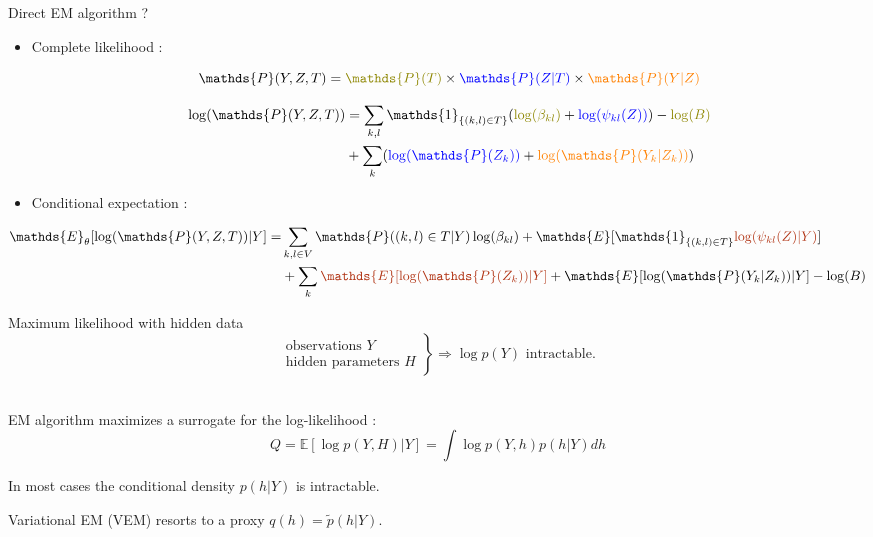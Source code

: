 \documentclass[11pt]{beamer}
\newcommand{\emphase}[1]{\textcolor{Complement}{#1}}
\newcommand{\bleu}[1]{\textcolor{Framableulight}{#1}}
\begin{document}
\begin{frame}{Direct EM algorithm ?}
\footnotesize 
\begin{itemize}
    \item \bleu{Complete likelihood :}

 \[ \mathds{P}(Y,Z,T) = \color{olive}\mathds{P}(T)\color{black}\times\color{blue}\mathds{P}(Z|T)\color{black}\times\color{orange}\mathds{P}(Y|Z)\]
 
\begin{align*}
 \log(\mathds{P}(Y,Z,T)) &= \sum_{k,l} \mathds{1}_{\{(k,l) \in T\}} (\color{olive}\log(\beta_{kl})\color{black} + \color{blue}\log(\psi_{kl}(Z)) \color{black})-\color{olive}\log(B)\color{black} \\
 &+\sum_k (\color{blue} \log(\mathds{P}(Z_k))\color{black} + \color{orange}\log(\mathds{P}(Y_k|Z_k))\color{black})
 \end{align*}
 
 \pause
 \item \bleu{Conditional expectation :}
\end{itemize}
\begin{align*}
    \mathds{E}_\theta[\log(\mathds{P}(Y,Z,T))|Y] =&\sum_{k,l\in V} \mathds{P}((k,l) \in T|Y) \log(\beta_{kl}) + \mathds{E}[\mathds{1}_{\{(k,l) \in T\}}\emphase{\log(\psi_{kl}(Z)|Y)}]\\
& +\sum_k \emphase{\mathds{E}[\log(\mathds{P}(Z_k)) | Y]} + \mathds{E}[\log(\mathds{P}(Y_k|Z_k)) | Y]-\log(B)
\end{align*} 

\normalsize 
\end{frame}
\begin{frame}{Maximum likelihood with hidden data}
  $$    \left.
   \begin{array}{cc}
    \text{observations } Y \\
    \text{hidden parameters } H 
   \end{array}
   \right\}\Rightarrow \log p(Y) \text{ intractable.}$$\\
   
   \bigskip   \bigskip
   
   \bleu{EM algorithm} maximizes a surrogate for the log-likelihood :
   $$Q = \mathds{E} [\log p (Y,H)|Y] = \int \log p(Y,h)p(h|Y) dh $$
   
   In most cases the conditional density $p(h|Y)$ is intractable.
    
    \bigskip    \bigskip
    
   \bleu{Variational EM} (VEM) resorts to a proxy $q(h)=\tilde{p}(h|Y)$.
\end{frame}

\end{document}
